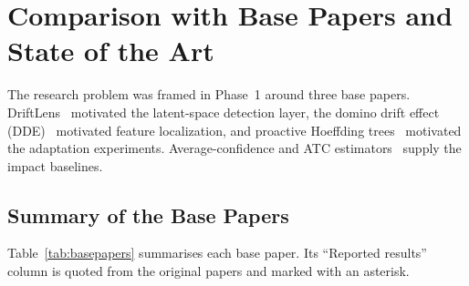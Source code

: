 \section{Comparison with Base Papers and State of the Art}
\label{sec:comparison}

The research problem was framed in Phase~1 around three base papers.
DriftLens~\cite{greco2025driftlens} motivated the latent-space detection layer, the
domino drift effect (DDE)~\cite{szucs2025dde} motivated feature localization, and
proactive Hoeffding trees~\cite{guerrerocano2026proactive} motivated the adaptation
experiments. Average-confidence and ATC estimators~\cite{garg2022atc,kivimaki2025confidence}
supply the impact baselines.

\subsection{Summary of the Base Papers}
Table~\ref{tab:basepapers} summarises each base paper. Its ``Reported results'' column
is quoted from the original papers and marked with an asterisk.

